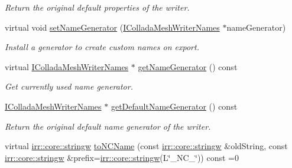 \begin{DoxyCompactItemize}
\begin{DoxyCompactList}\small\item\em Return the original default properties of the writer. \end{DoxyCompactList}\item 
\mbox{\label{classirr_1_1scene_1_1IColladaMeshWriter_a7e48b43c91133e482e76da54849ef153}} 
virtual void \hyperlink{classirr_1_1scene_1_1IColladaMeshWriter_a7e48b43c91133e482e76da54849ef153}{set\+Name\+Generator} (\hyperlink{classirr_1_1scene_1_1IColladaMeshWriterNames}{I\+Collada\+Mesh\+Writer\+Names} $\ast$name\+Generator)
\begin{DoxyCompactList}\small\item\em Install a generator to create custom names on export. \end{DoxyCompactList}\item 
\mbox{\label{classirr_1_1scene_1_1IColladaMeshWriter_ad519f6ce64dcf1013b6fe0b9aaa67b40}} 
virtual \hyperlink{classirr_1_1scene_1_1IColladaMeshWriterNames}{I\+Collada\+Mesh\+Writer\+Names} $\ast$ \hyperlink{classirr_1_1scene_1_1IColladaMeshWriter_ad519f6ce64dcf1013b6fe0b9aaa67b40}{get\+Name\+Generator} () const
\begin{DoxyCompactList}\small\item\em Get currently used name generator. \end{DoxyCompactList}\item 
\hyperlink{classirr_1_1scene_1_1IColladaMeshWriterNames}{I\+Collada\+Mesh\+Writer\+Names} $\ast$ \hyperlink{classirr_1_1scene_1_1IColladaMeshWriter_acd10fcf2458271d59cf76284613288f6}{get\+Default\+Name\+Generator} () const
\begin{DoxyCompactList}\small\item\em Return the original default name generator of the writer. \end{DoxyCompactList}\item 
virtual \hyperlink{namespaceirr_1_1core_a5aedb62cb47cf01d1c548ab5e6344d2d}{irr\+::core\+::stringw} \hyperlink{classirr_1_1scene_1_1IColladaMeshWriter_ac9c48beab095aa6f4cb4f696bb2ecd45}{to\+N\+C\+Name} (const \hyperlink{namespaceirr_1_1core_a5aedb62cb47cf01d1c548ab5e6344d2d}{irr\+::core\+::stringw} \&old\+String, const \hyperlink{namespaceirr_1_1core_a5aedb62cb47cf01d1c548ab5e6344d2d}{irr\+::core\+::stringw} \&prefix=\hyperlink{namespaceirr_1_1core_a5aedb62cb47cf01d1c548ab5e6344d2d}{irr\+::core\+::stringw}(L\char`\"{}\+\_\+\+N\+C\+\_\+\char`\"{})) const =0

\end{DoxyCompactItemize}
